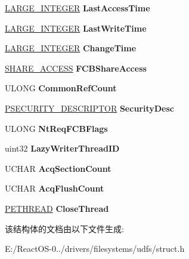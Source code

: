 \begin{DoxyCompactItemize}
\mbox{\label{struct___u_d_f_n_t_required_f_c_b_a87c9e951e90a76837e3a990d812dddd5}} 
\hyperlink{union___l_a_r_g_e___i_n_t_e_g_e_r}{L\+A\+R\+G\+E\+\_\+\+I\+N\+T\+E\+G\+ER} {\bfseries Last\+Access\+Time}
\item 
\mbox{\label{struct___u_d_f_n_t_required_f_c_b_a2c92403a0ca72db61325e57b13054e29}} 
\hyperlink{union___l_a_r_g_e___i_n_t_e_g_e_r}{L\+A\+R\+G\+E\+\_\+\+I\+N\+T\+E\+G\+ER} {\bfseries Last\+Write\+Time}
\item 
\mbox{\label{struct___u_d_f_n_t_required_f_c_b_af9fd9daf21dc1597a97a23a09e26bd5b}} 
\hyperlink{union___l_a_r_g_e___i_n_t_e_g_e_r}{L\+A\+R\+G\+E\+\_\+\+I\+N\+T\+E\+G\+ER} {\bfseries Change\+Time}
\item 
\mbox{\label{struct___u_d_f_n_t_required_f_c_b_a61bb17de25eb6c786bbe41d5574579da}} 
\hyperlink{struct___s_h_a_r_e___a_c_c_e_s_s}{S\+H\+A\+R\+E\+\_\+\+A\+C\+C\+E\+SS} {\bfseries F\+C\+B\+Share\+Access}
\item 
\mbox{\label{struct___u_d_f_n_t_required_f_c_b_a4231ff8135281acd27815d02bf8c33de}} 
U\+L\+O\+NG {\bfseries Common\+Ref\+Count}
\item 
\mbox{\label{struct___u_d_f_n_t_required_f_c_b_a045b20ce5a4d5e41d099f98a5dfefc47}} 
\hyperlink{struct___s_e_c_u_r_i_t_y___d_e_s_c_r_i_p_t_o_r}{P\+S\+E\+C\+U\+R\+I\+T\+Y\+\_\+\+D\+E\+S\+C\+R\+I\+P\+T\+OR} {\bfseries Security\+Desc}
\item 
\mbox{\label{struct___u_d_f_n_t_required_f_c_b_a58a6ce3cb470f4082b92f74a39f86954}} 
U\+L\+O\+NG {\bfseries Nt\+Req\+F\+C\+B\+Flags}
\item 
\mbox{\label{struct___u_d_f_n_t_required_f_c_b_ababa4106c53095cc69f9d030447ca6f4}} 
uint32 {\bfseries Lazy\+Writer\+Thread\+ID}
\item 
\mbox{\label{struct___u_d_f_n_t_required_f_c_b_a5f25705b9db3ad1fc6a523c72093f611}} 
U\+C\+H\+AR {\bfseries Acq\+Section\+Count}
\item 
\mbox{\label{struct___u_d_f_n_t_required_f_c_b_aa57983e07c62840630a761a20a5c3893}} 
U\+C\+H\+AR {\bfseries Acq\+Flush\+Count}
\item 
\mbox{\label{struct___u_d_f_n_t_required_f_c_b_a8f618e7373e303c7f771ba3a5431c761}} 
\hyperlink{struct___e_t_h_r_e_a_d}{P\+E\+T\+H\+R\+E\+AD} {\bfseries Close\+Thread}
\end{DoxyCompactItemize}


该结构体的文档由以下文件生成\+:\begin{DoxyCompactItemize}
\item 
E\+:/\+React\+O\+S-\/0../drivers/filesystems/udfs/struct.\+h\end{DoxyCompactItemize}
